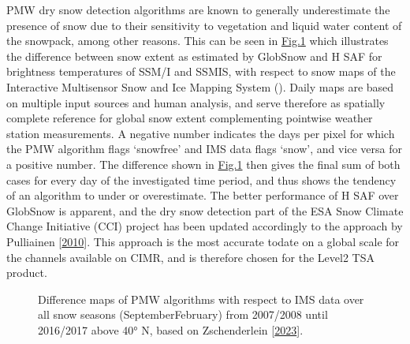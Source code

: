 \documentclass[letterpaper,10pt,english]{jupyterBook}
\let\sphinxpxdimen\pdfpxdimen\else\newdimen\sphinxpxdimen
\begin{document}
\sphinxAtStartPar
PMW dry snow detection algorithms are known to generally underestimate the presence of snow due to their sensitivity to vegetation and liquid water content of the snowpack, among other reasons.
This can be seen in \hyperref[\detokenize{book/background_justification_algorithm:difference}]{Fig.\@ \ref{\detokenize{book/background_justification_algorithm:difference}}} which illustrates the difference between snow extent as estimated by GlobSnow and H SAF for brightness temperatures of SSM/I and SSMIS, with respect to snow maps of the Interactive Multisensor Snow and Ice Mapping System ({\hyperref[\detokenize{book/acronyms:term-IMS}]{}}).
Daily {\hyperref[\detokenize{book/acronyms:term-IMS}]{}} maps are based on multiple input sources and human analysis, and serve therefore as spatially complete reference for global snow extent complementing pointwise weather station measurements.
A negative number indicates the days per pixel for which the PMW algorithm flags ‘snow\sphinxhyphen{}free’ and IMS data flags ‘snow’, and vice versa for a positive number.
The difference shown in \hyperref[\detokenize{book/background_justification_algorithm:difference}]{Fig.\@ \ref{\detokenize{book/background_justification_algorithm:difference}}} then gives the final sum of both cases for every day of the investigated time period, and thus shows the tendency of an algorithm to under\sphinxhyphen{} or overestimate.
The better performance of H SAF over GlobSnow is apparent, and the dry snow detection part of the ESA Snow Climate Change Initiative (CCI) project has been updated accordingly to the approach by Pulliainen  {[}\hyperlink{cite.book/references:id3}{2010}{]}.
This approach is the most accurate to\sphinxhyphen{}date on a global scale for the channels available on CIMR, and is therefore chosen for the Level\sphinxhyphen{}2 TSA product.

\begin{figure}[htbp]
\centering
\capstart

\noindent\sphinxincludegraphics[width=600\sphinxpxdimen]{{difference}.png}
\caption{Difference maps of PMW algorithms with respect to IMS data over all snow seasons (September\sphinxhyphen{}February) from 2007/2008 until 2016/2017 above 40° N, based on Zschenderlein  {[}\hyperlink{cite.book/references:id18}{2023}{]}.}\label{\detokenize{book/background_justification_algorithm:difference}}\end{figure}
\end{document}

